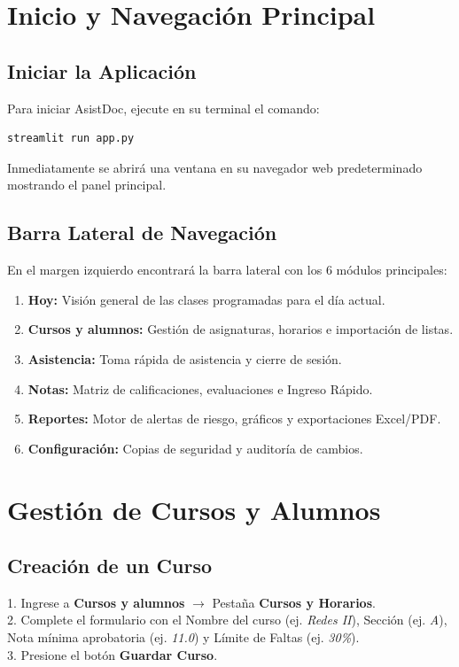\documentclass[12pt,a4paper]{article}
\begin{document}
\section{Inicio y Navegación Principal}

\subsection{Iniciar la Aplicación}
Para iniciar AsistDoc, ejecute en su terminal el comando:
\begin{verbatim}
streamlit run app.py
\end{verbatim}
Inmediatamente se abrirá una ventana en su navegador web predeterminado mostrando el panel principal.

\subsection{Barra Lateral de Navegación}
En el margen izquierdo encontrará la barra lateral con los 6 módulos principales:
\begin{enumerate}
    \item \textbf{Hoy:} Visión general de las clases programadas para el día actual.
    \item \textbf{Cursos y alumnos:} Gestión de asignaturas, horarios e importación de listas.
    \item \textbf{Asistencia:} Toma rápida de asistencia y cierre de sesión.
    \item \textbf{Notas:} Matriz de calificaciones, evaluaciones e Ingreso Rápido.
    \item \textbf{Reportes:} Motor de alertas de riesgo, gráficos y exportaciones Excel/PDF.
    \item \textbf{Configuración:} Copias de seguridad y auditoría de cambios.
\end{enumerate}

\section{Gestión de Cursos y Alumnos}

\subsection{Creación de un Curso}
1. Ingrese a \textbf{Cursos y alumnos} $\rightarrow$ Pestaña \textbf{Cursos y Horarios}.\\
2. Complete el formulario con el Nombre del curso (ej. \textit{Redes II}), Sección (ej. \textit{A}), Nota mínima aprobatoria (ej. \textit{11.0}) y Límite de Faltas (ej. \textit{30\%}).\\
3. Presione el botón \textbf{Guardar Curso}.
\end{document}
